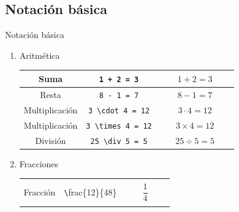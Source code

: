 \documentclass[../slides.tex]{subfiles}
\begin{document}
    \subsection{Notación básica}
    
    \begin{frame}{Notación básica}
        \begin{enumerate}
            \item Aritmética
                \begin{center}
                \begin{tabular}{|c|c|c|}
                \hline
                    Suma & \texttt{1 + 2 = 3} & $\quad\quad1 + 2 = 3\quad\quad$\\
                \hline
                    Resta & \texttt{8 - 1 = 7} & $8 - 1 = 7$\\
                \hline
                    Multiplicación & \texttt{3 \textbackslash cdot 4 = 12} & $3 \cdot 4 = 12$\\
                \hline
                    Multiplicación & \texttt{3 \textbackslash times 4 = 12} & $3 \times 4 = 12$\\
                \hline
                    División & \texttt{25 \textbackslash div 5 = 5} & $25 \div 5 = 5$\\
                \hline
                \end{tabular}
                \end{center}
            \item Fracciones
                \begin{center}
                \begin{tabular}{|c|c|c|}
                \hline
                    & & \\
                    Fracción & \texttt \textbackslash frac\{12\}\{48\} & $\quad\quad\dfrac{1}{4}\quad\quad$ \\
                    & & \\
                \hline
                \end{tabular}
                \end{center}
        \end{enumerate}

    \end{frame}
\end{document}
